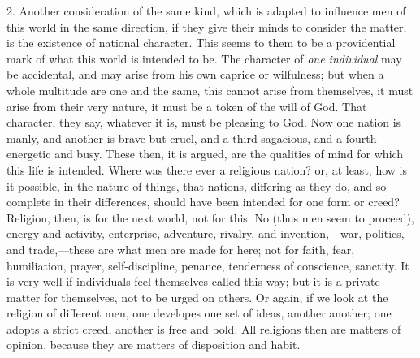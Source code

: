 2. Another consideration of the same kind, which is adapted to
influence men of this world in the same direction, if they give their
minds to consider the matter, is the existence of national character.
This seems to them to be a providential mark of what this world is
intended to be. The character of \emph{one individual} may be
accidental, and may arise from his own caprice or wilfulness; but when
a whole multitude are one and the same, this cannot arise from
themselves, it must arise from their very nature, it must be a token
of the will of God. That character, they say, whatever it is, must be
pleasing to God. Now one nation is manly, and another is brave but
cruel, and a third sagacious, and a fourth energetic and busy. These
then, it is argued, are the qualities of mind for which this life is
intended. Where was there ever a religious nation? or, at least, how
is it possible, in the nature of things, that nations, differing as
they do, and so complete in their differences, should have been
intended for one form or creed? Religion, then, is for the next world,
not for this. No (thus men seem to proceed), energy and activity,
enterprise, adventure, rivalry, and invention,—war, politics, and
trade,—these are what men are made for here; not for faith, fear,
humiliation, prayer, self-discipline, penance, tenderness of
conscience, sanctity. It is very well if individuals feel themselves
called this way; but it is a private matter for themselves, not to be
urged on others. Or again, if we look at the religion of different
men, one developes one set of ideas, another another; one adopts a
strict creed, another is free and bold. All religions then are matters
of opinion, because they are matters of disposition and habit.

